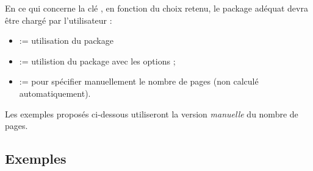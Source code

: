 \begin{warningblock}
En ce qui concerne la clé , en fonction du choix retenu, le package adéquat devra être chargé par l'utilisateur :

\begin{itemize}
	\item {} := utilisation du package 
	\item {} := utilistion du package  avec les options  ;
	\item {} := pour spécifier manuellement le nombre de pages (non calculé automatiquement).
\end{itemize}

Les exemples proposés ci-dessous utiliseront la version \textit{manuelle} du nombre de pages.
\end{warningblock}

\pagebreak

\subsection{Exemples}

\begin{PresCodePL}{}
\PageGardeSujetBac[DernierePage=5]
\end{PresCodePL}

\pagebreak

\begin{PresCodePL}{}
\PageGardeSujetBac%
	[DernierePage=12,CalculatriceInterdite,Traiter,Police=\sffamily,
	Jour={Bac Blanc n°2 - Vendredi 19 avril 2024},Duree={3 heures},
	LargeurPar=0.75\linewidth]
\end{PresCodePL}

\pagebreak

\begin{PresCodePL}{}
\PageGardeSujetBac%
	[Police=\ttfamily,Serie=TECHNO,%
	DernierePage=3]
\end{PresCodePL}

\pagebreak

\begin{PresCodePL}{}
\PageGardeSujetBac%
	[Police=\sffamily,Serie=PRO,
	AffJour=false,DernierePage=8,%
	Duree={2 heures},%
	Filiere={SECTEUR TERTIAIRE},
	Matiere={ÉPREUVE DE MATHÉMATIQUES},%
	DernierePage=4]
\end{PresCodePL}

\pagebreak

\begin{PresCodePL}{}
\PageGardeSujetBacEAM[Police=\sffamily,DernierePage=5]
\end{PresCodePL}
